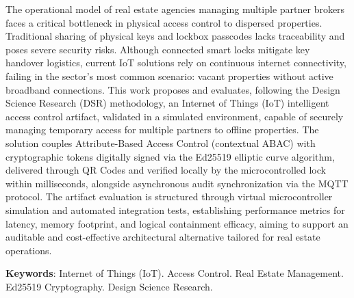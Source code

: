 \begin{resumo}[Abstract]
\SingleSpacing
\noindent
The operational model of real estate agencies managing multiple partner brokers faces a critical bottleneck in physical access control to dispersed properties. Traditional sharing of physical keys and lockbox passcodes lacks traceability and poses severe security risks. Although connected smart locks mitigate key handover logistics, current IoT solutions rely on continuous internet connectivity, failing in the sector's most common scenario: vacant properties without active broadband connections. This work proposes and evaluates, following the Design Science Research (DSR) methodology, an Internet of Things (IoT) intelligent access control artifact, validated in a simulated environment, capable of securely managing temporary access for multiple partners to offline properties. The solution couples Attribute-Based Access Control (contextual ABAC) with cryptographic tokens digitally signed via the Ed25519 elliptic curve algorithm, delivered through QR Codes and verified locally by the microcontrolled lock within milliseconds, alongside asynchronous audit synchronization via the MQTT protocol. The artifact evaluation is structured through virtual microcontroller simulation and automated integration tests, establishing performance metrics for latency, memory footprint, and logical containment efficacy, aiming to support an auditable and cost-effective architectural alternative tailored for real estate operations.

\vspace{\onelineskip}
\noindent
\textbf{Keywords}: Internet of Things (IoT). Access Control. Real Estate Management. Ed25519 Cryptography. Design Science Research.
\end{resumo}